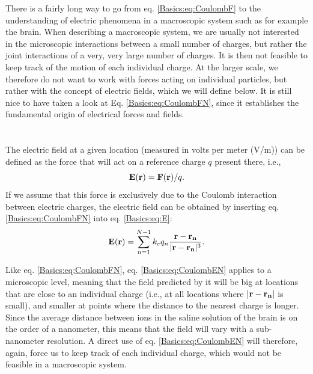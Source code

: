 There is a fairly long way to go from eq. \ref{Basics:eq:CoulombF} to the understanding of electric phenomena in a macroscopic system such as for example the brain. When describing a macroscopic system, we are usually not interested in the microscopic interactions between a small number of charges, but rather the joint interactions of a very, very large number of charges. It is then not feasible to keep track of the motion of each individual charge. At the larger scale, we therefore do not want to work with forces acting on individual particles, but rather with the concept of electric fields, which we will define below. It is still nice to have taken a look at  Eq. \ref{Basics:eq:CoulombFN}, since it establishes the fundamental origin of electrical forces and fields. 


\section{}
\label{sec:Basics:Fields} 
The electric field at a given location (measured in volts per meter (V/m)) can be defined as the force that will act on a reference charge $q$ present there, i.e., 
\begin{equation}
{\bf E}({\bf r}) = {\bf F}({\bf r})/q.
\label{Basics:eq:E}
\end{equation}
If we assume that this force is exclusively due to the Coulomb interaction between electric charges, the electric field can be obtained by inserting eq. \ref{Basics:eq:CoulombFN} into eq. \ref{Basics:eq:E}:
\begin{equation}
{\bf E}({\bf r}) = \sum_{n=1}^{N-1} k_e q_n \frac{{\bf r}-{\bf r_n}}{|{\bf r}-{\bf r_n}|^3}.
\label{Basics:eq:CoulombEN}
\end{equation}

Like eq. \ref{Basics:eq:CoulombFN}, eq. \ref{Basics:eq:CoulombEN} applies to a microscopic level, meaning that the field predicted by it will be big at locations that are close to an individual charge (i.e., at all locations where $|{\bf r}-{\bf r_n}|$ is small), and smaller at points where the distance to the nearest charge is longer. Since the average distance between ions in the saline solution of the brain is on the order of a nanometer, this means that the field will vary with a sub-nanometer resolution. A direct use of eq. \ref{Basics:eq:CoulombEN} will therefore, again, force us to keep track of each individual charge, which would not be feasible in a macroscopic system.

